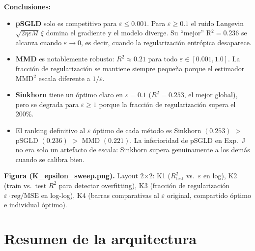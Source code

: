 \documentclass[11pt, a4paper]{article}
\theoremstyle{definition}
\begin{document}
\textbf{Conclusiones:}
\begin{itemize}
  \item \textbf{pSGLD} solo es competitivo para $\varepsilon \leq 0.001$.
        Para $\varepsilon \geq 0.1$ el ruido Langevin $\sqrt{2\eta\varepsilon M}\,\xi$
        domina el gradiente y el modelo diverge.
        Su ``mejor'' R$^2=0.236$ se alcanza cuando $\varepsilon \to 0$,
        es decir, cuando la regularización entrópica desaparece.
  \item \textbf{MMD} es notablemente robusto: $R^2 \approx 0.21$ para todo
        $\varepsilon \in [0.001, 1.0]$. La fracción de regularización se mantiene
        siempre pequeña porque el estimador MMD$^2$ escala diferente a $1/\varepsilon$.
  \item \textbf{Sinkhorn} tiene un óptimo claro en $\varepsilon=0.1$
        ($R^2=0.253$, el mejor global), pero se degrada para $\varepsilon \geq 1$
        porque la fracción de regularización supera el 200\%.
  \item El ranking definitivo al $\varepsilon$ óptimo de cada método es
        Sinkhorn $(0.253)$ $>$ pSGLD $(0.236)$ $>$ MMD $(0.221)$.
        La inferioridad de pSGLD en Exp.~J no era solo un artefacto de
        escala: Sinkhorn supera genuinamente a los demás cuando se calibra bien.
\end{itemize}

\textbf{Figura (K\_epsilon\_sweep.png).} Layout 2×2:
K1 ($R^2_\text{test}$ vs.\ $\varepsilon$ en log),
K2 (train vs.\ test $R^2$ para detectar overfitting),
K3 (fracción de regularización $\varepsilon\cdot\text{reg}/\text{MSE}$ en log-log),
K4 (barras comparativas al $\varepsilon$ original, compartido óptimo e individual óptimo).

\section{Resumen de la arquitectura}
\label{sec:resumen}
\end{document}
